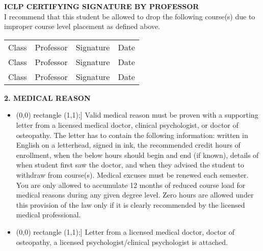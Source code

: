 \documentclass[11pt]{article}
\newcommand{\checkbox}{\tikz\draw[scale=0.5,thick] (0,0) rectangle (1,1);}
\begin{document}
\noindent \textbf{ICLP CERTIFYING SIGNATURE BY PROFESSOR}\\
I recommend that this student be allowed to drop the following course(s) due to improper course level placement as defined above.

\begin{tabular}{llll}
Class\underline{\hspace{1.5cm}} & Professor \underline{\hspace{1.5cm}} & Signature\underline{\hspace{2cm}} & Date\underline{\hspace{1.5cm}} \\
Class\underline{\hspace{1.5cm}} & Professor \underline{\hspace{1.5cm}} & Signature\underline{\hspace{2cm}} & Date\underline{\hspace{1.5cm}} \\
Class\underline{\hspace{1.5cm}} & Professor \underline{\hspace{1.5cm}} & Signature\underline{\hspace{2cm}} & Date\underline{\hspace{1.5cm}} \\
\end{tabular}

\vspace{0.5cm}
\noindent \textbf{2. MEDICAL REASON}
\begin{itemize}[leftmargin=0.5cm]
    \item[\checkbox] Valid medical reason must be proven with a supporting letter from a licensed medical doctor, clinical psychologist, or doctor of osteopathy. The letter has to contain the following information: written in English on a letterhead, signed in ink, the recommended credit hours of enrollment, when the below hours should begin and end (if known), details of when student first saw the doctor, and when they advised the student to withdraw from course(s). Medical excuses must be renewed each semester. You are only allowed to accumulate 12 months of reduced course load for medical reasons during any given degree level. Zero hours are allowed under this provision of the law only if it is clearly recommended by the licensed medical professional.

    \vspace{0.3cm}
    \item[\checkbox] Letter from a licensed medical doctor, doctor of osteopathy, a licensed psychologist/clinical psychologist is attached.
\end{itemize}
\end{document}
